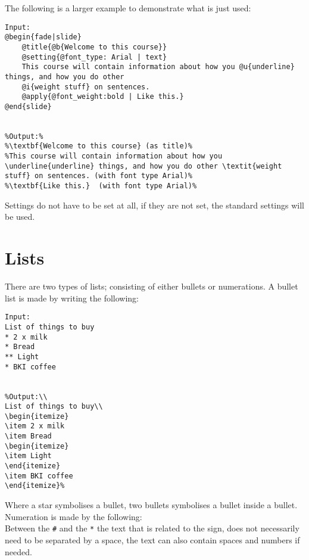 The following is a larger example to demonstrate what is just used: \\

\begin{lstlisting}[frame=single]
Input:
@begin{fade|slide}
    @title{@b{Welcome to this course}}
    @setting{@font_type: Arial | text}
    This course will contain information about how you @u{underline} things, and how you do other    
    @i{weight stuff} on sentences.
    @apply{@font_weight:bold | Like this.}
@end{slide}


%Output:%
%\textbf{Welcome to this course} (as title)%
%This course will contain information about how you \underline{underline} things, and how you do other \textit{weight stuff} on sentences. (with font type Arial)%
%\textbf{Like this.}  (with font type Arial)%
\end{lstlisting}

Settings do not have to be set at all, if they are not set, the standard settings will be used.

\section{Lists}
There are two types of lists; consisting of either bullets or numerations.
A bullet list is made by writing the following: \\

\begin{lstlisting}[frame=single]
Input:
List of things to buy
* 2 x milk
* Bread
** Light
* BKI coffee

 
%Output:\\
List of things to buy\\
\begin{itemize}
\item 2 x milk
\item Bread
\begin{itemize}
\item Light
\end{itemize}
\item BKI coffee
\end{itemize}%
\end{lstlisting}

Where a star symbolises a bullet, two bullets symbolises a bullet inside a bullet.
Numeration is made by the following: \\
Between the \texttt{\#} and the \texttt{*} the text that is related to the sign, does not necessarily need to be separated by a space, the text can also contain spaces and numbers if needed.\\

